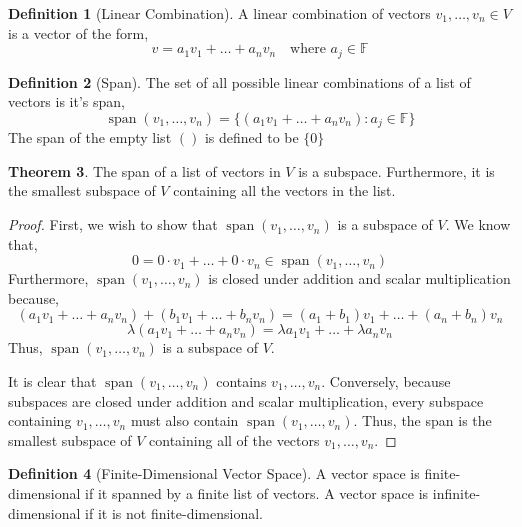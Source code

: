 \documentclass[12pt]{report}
\numberwithin{equation}{section}
\theoremstyle{definition}
\newtheorem{theorem}{Theorem}[section]
\newtheorem{definition}[theorem]{Definition}
\DeclareMathOperator{\spann}{span}
\begin{document}
\begin{definition}[Linear Combination]
	A linear combination of vectors $ v_1, \dots, v_n\in V $ is a vector of the form,
	\begin{equation}
			v = a_1v_1 + \dots + a_nv_n \quad \text{where }a_j\in \mathbb{F}
	\end{equation}
\end{definition}

\begin{definition}[Span]
	The set of all possible linear combinations of a list of vectors is it's span,
	\begin{equation}
			\spann (v_1, \dots, v_n) = \{(a_1v_1 + \dots + a_nv_n): a_j\in \mathbb{F} \}
	\end{equation}
	The span of the empty list $ () $ is defined to be $ \{0\} $
\end{definition}

\begin{theorem}
	The span of a list of vectors in $ V $ is a subspace. Furthermore, it is the smallest subspace of $ V $ containing all the vectors in the list.
\end{theorem}
\begin{proof}
	First, we wish to show that $ \spann (v_1, \dots, v_n)  $ is a subspace of $ V $. We know that,
	\begin{equation}
			0 = 0\cdot v_1 + \dots + 0 \cdot v_n \in \spann (v_1, \dots, v_n) 
	\end{equation}
	Furthermore, $ \spann (v_1, \dots, v_n)  $ is closed under addition and scalar multiplication because,
	\begin{equation}
			(a_1v_1 + \dots + a_nv_n) + (b_1v_1 + \dots + b_nv_n) = (a_1 + b_1)v_1 +\dots + (a_n + b_n)v_n
	\end{equation}
	\begin{equation}
			\lambda (a_1v_1 + \dots + a_nv_n) = \lambda a_1v_1 + \dots + \lambda a_nv_n
	\end{equation}
	Thus, $ \spann (v_1, \dots, v_n)  $ is a subspace of $ V $.
	
	It is clear that $ \spann (v_1, \dots, v_n)  $ contains $ v_1, \dots, v_n$. Conversely, because subspaces are closed under addition and scalar multiplication, every subspace containing $ v_1, \dots, v_n$ must also contain $ \spann (v_1, \dots, v_n)  $. Thus, the span is the smallest subspace of $ V $ containing all of the vectors  $ v_1, \dots, v_n$.
\end{proof}

\begin{definition}[Finite-Dimensional Vector Space]
	A vector space is finite-dimensional if it spanned by a finite list of vectors. A vector space is infinite-dimensional if it is not finite-dimensional.
	\label{def:fd}
\end{definition}
\end{document}

